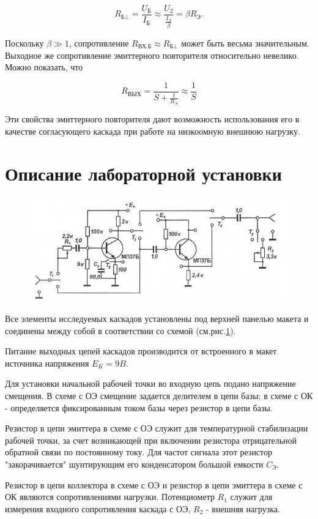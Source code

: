 $$R_{\text{Б} \bot}=\frac{U_{\text{Б}}}{I_{\text{Б}}} \approx \frac{U_2}{ \frac{ I_{ \text{Э} } }{\beta}}=\beta R_{\text{Э}}.$$

Поскольку $\beta \gg 1$, сопротивление  $R_{\text{ВХ.Б}} \approx R_{\text{Б} \bot}$ может быть весьма значительным. Выходное же сопротивление эмиттерного повторителя относительно невелико. Можно показать, что

$$R_{\text{ВЫХ}}=\frac{1}{S+\frac{1}{R_{\text{Э}}}} \approx \frac{1}{S}$$

Эти свойства эмиттерного повторителя дают возможность использования его в качестве согласующего каскада при работе на низкоомную внешнюю нагрузку.


\section{Описание лабораторной установки}
\begin{figure}[h!]
	\centering
	\includegraphics[width=\linewidth]{fig/fig7}
	\caption{}
	\label{fig:7}
\end{figure}
Все элементы исследуемых каскадов установлены под верхней панелью макета и соединены между собой в соответствии со схемой (см.рис.\ref{fig:7}).

Питание выходных цепей каскадов производится от встроенного в макет источника напряжения $E_K=9B$.

Для установки начальной рабочей точки во входную цепь подано напряжение смещения. В схеме с ОЭ смещение задается делителем в цепи базы; в схеме с ОК - определяется фиксированным током базы через резистор в цепи базы.

Резистор в цепи эмиттера в схеме с ОЭ служит для температурной стабилизации рабочей точки, за счет возникающей при включении резистора отрицательной обратной связи по постоянному току. Для частот сигнала этот резистор "закорачивается" шунтирующим его конденсатором большой емкости $C_{\text{Э}}$.

Резистор в цепи коллектора в схеме с ОЭ и резистор в цепи эмиттера в схеме с ОК являются сопротивлениями нагрузки. Потенциометр $R_1$ служит для измерения входного сопротивления
каскада с ОЭ, $R_2$ - внешняя нагрузка.


